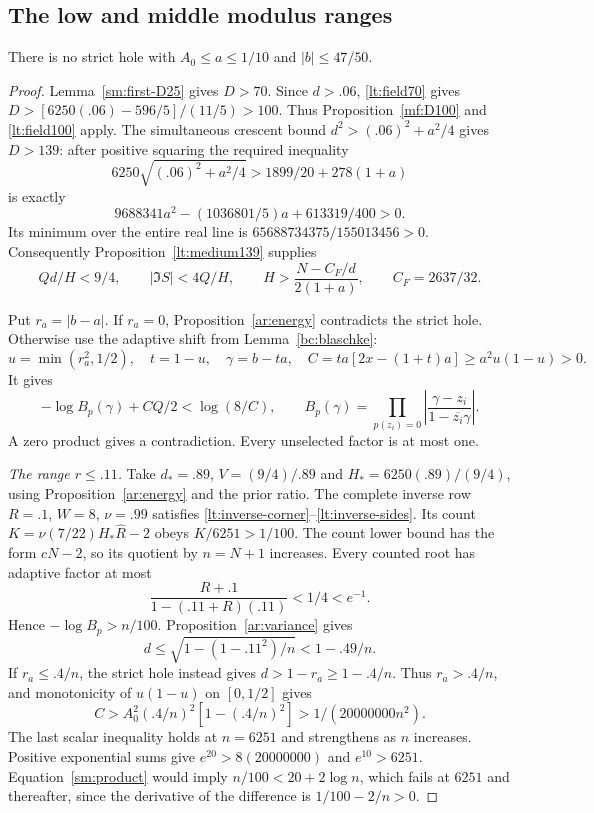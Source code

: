 \subsection{The low and middle modulus ranges}

\begin{proposition}\label{sm:low-middle}
There is no strict hole with $A_0\le a\le1/10$ and $|b|\le47/50$.
\end{proposition}
\begin{proof}
Lemma~\ref{sm:first-D25} gives $D>70$. Since $d>.06$,
\eqref{lt:field70} gives $D>[6250(.06)-596/5]/(11/5)>100$.
Thus Proposition~\ref{mf:D100} and \eqref{lt:field100} apply.
The simultaneous crescent bound
$d^2>(.06)^2+a^2/4$ gives $D>139$: after positive squaring the
required inequality
\[
 6250\sqrt{(.06)^2+a^2/4}>1899/20+278(1+a)
\]
is exactly
\[
 9688341a^2-(1036801/5)a+613319/400>0.
\]
Its minimum over the entire real line is
$65688734375/155013456>0$.
Consequently Proposition~\ref{lt:medium139} supplies
\begin{equation}\label{sm:middle-input}
 Qd/H<9/4,\qquad |\Im S|<4Q/H,\qquad
 H>\frac{N-C_F/d}{2(1+a)},\qquad C_F=2637/32.
\end{equation}

Put $r_a=|b-a|$. If $r_a=0$, Proposition~\ref{ar:energy}
contradicts the strict hole. Otherwise use the adaptive
shift from Lemma~\ref{bc:blaschke}:
\[
 u=\min(r_a^2,1/2),\quad t=1-u,\quad
 \gamma=b-ta,\quad C=ta[2x-(1+t)a]\ge a^2u(1-u)>0.
\]
It gives
\begin{equation}\label{sm:product}
 -\log B_p(\gamma)+CQ/2<\log(8/C),\qquad
 B_p(\gamma)=\prod_{p(z_i)=0}
              \left|\frac{\gamma-z_i}{1-\overline{z_i}\gamma}\right|.
\end{equation}
A zero product gives a contradiction. Every unselected factor
is at most one.

\smallskip\noindent\emph{The range $r\le.11$.}
Take $d_*=.89$, $V=(9/4)/.89$ and $H_*=6250(.89)/(9/4)$,
using Proposition~\ref{ar:energy} and the prior ratio.
The complete inverse row $R=.1$, $W=8$, $\nu=.99$ satisfies
\eqref{lt:inverse-corner}--\eqref{lt:inverse-sides}. Its count
$K=\nu(7/22)H_*\widehat R-2$ obeys $K/6251>1/100$.
The count lower bound has the form $cN-2$, so its quotient by $n=N+1$
increases. Every counted root has adaptive factor at most
\[
 \frac{R+.1}{1-(.11+R)(.11)}<1/4<e^{-1}.
\]
Hence $-\log B_p>n/100$. Proposition~\ref{ar:variance} gives
\[
 d\le\sqrt{1-(1-.11^2)/n}<1-.49/n.
\]
If $r_a\le.4/n$, the strict hole instead gives
$d>1-r_a\ge1-.4/n$. Thus $r_a>.4/n$, and monotonicity of
$u(1-u)$ on $[0,1/2]$ gives
\[
 C>A_0^2(.4/n)^2[1-(.4/n)^2]>1/(20000000n^2).
\]
The last scalar inequality holds at $n=6251$ and strengthens as $n$
increases. Positive exponential sums give $e^{20}>8(20000000)$
and $e^{10}>6251$. Equation~\eqref{sm:product} would imply
$n/100<20+2\log n$, which fails at $6251$ and thereafter, since
the derivative of the difference is $1/100-2/n>0$.


\end{proof}
